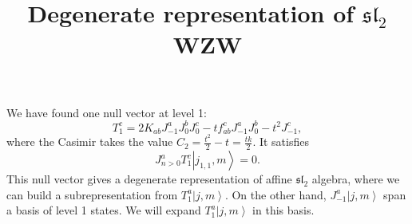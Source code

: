 \documentclass[10pt,a4paper]{article}
\numberwithin{equation}{section}
\newcommand{\ket}[1]{\left| #1 \right\rangle}
\begin{document}
\title{Degenerate representation of $\mathfrak{sl}_{2}$ WZW}
\maketitle

We have found one null vector at level 1: 
\begin{equation}
    T^{c}_{1} = 2 K_{ab} J^{a}_{-1} J^{b}_{0} J^{c}_{0} - t f^{c}_{ab} J^{a}_{-1} J^{b}_{0} - t^{2} J^{c}_{-1},
\end{equation}
where the Casimir takes the value $C_{2} = \frac{t^{2}}{2} - t = \frac{tk}{2}$. It satisfies 
\begin{equation}
    J^{a}_{n>0} T^{c}_{1} \ket{j_{1,1},m} = 0.
\end{equation}
This null vector gives a degenerate representation of affine $\mathfrak{sl}_{2} $ algebra, where we can build a subrepresentation
from $T^{a}_{1} \ket{j,m}$. On the other hand, $J^{a}_{-1}\ket{j,m}$ span a basis of level 1 states. We will expand $T^{a}_{1} \ket{j,m}$ in this basis. \\
\end{document}
